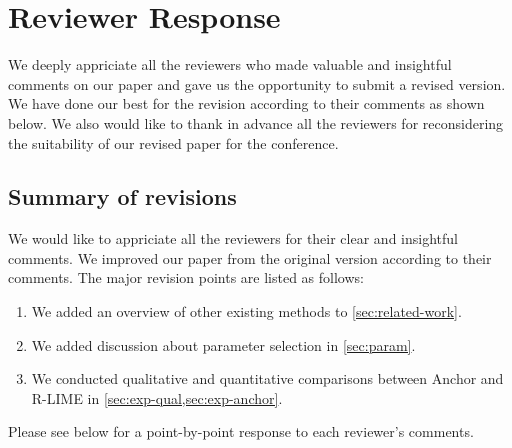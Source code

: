 \documentclass[runningheads]{llncs}
\begin{document}
\newenvironment{mycomment}{
  \vspace{10pt}\hspace{.02\textwidth}\begin{minipage}{.92\textwidth}
    }{\end{minipage}}

\section*{Reviewer Response}
We deeply appriciate all the reviewers who made valuable and insightful comments
on our paper and gave us the opportunity to submit a revised version.
We have done our best for the revision according to their comments as shown below.
We also would like to thank in advance all the reviewers for reconsidering
the suitability of our revised paper for the conference.

\subsection*{Summary of revisions}
We would like to appriciate all the reviewers for their clear and insightful
comments.
We improved our paper from the original version according to their comments.
The major revision points are listed as follows:
\begin{enumerate}
  \item We added an overview of other existing methods to \cref{sec:related-work}.
  \item We added discussion about parameter selection in \cref{sec:param}.
  \item We conducted qualitative and quantitative comparisons
        between Anchor and R-LIME in \cref{sec:exp-qual,sec:exp-anchor}.
\end{enumerate}
Please see below for a point-by-point response to each reviewer's comments.
\end{document}
